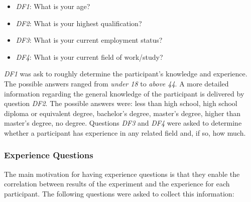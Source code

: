 \begin{itemize}
    \item \textit{DF1}: What is your age?
    \item \textit{DF2}: What is your highest qualification?
    \item \textit{DF3}: What is your current employment status?
    \item \textit{DF4}: What is your current field of work/study?
\end{itemize}
\textit{DF1} was ask to roughly determine the participant's knowledge and experience. The possible answers ranged from \textit{under 18} to \textit{above 44}. A more detailed information regarding the general knowledge of the participant is delivered by question \textit{DF2}. The possible answers were: less than high school, high school diploma or equivalent degree, bachelor's degree, master's degree, higher than master's degree, no degree. Questions \textit{DF3} and \textit{DF4} were asked to determine whether a participant has experience in any related field and, if so, how much.

\subsubsection*{Experience Questions}
The main motivation for having experience questions is that they enable the correlation between results of the experiment and the experience for each participant. The following questions were asked to collect this information:

